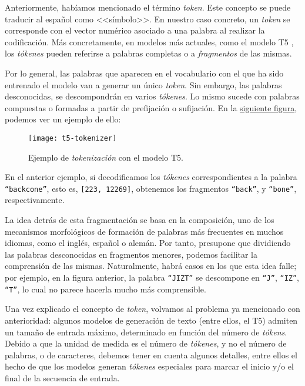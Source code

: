 Anteriormente, habíamos mencionado el término \emph{token}. Este concepto se puede traducir al español como <<símbolo>>. En nuestro caso concreto, un \emph{token} se corresponde con el vector numérico asociado a una palabra al realizar la codificación. Más concretamente, en modelos más actuales, como el modelo T5 \cite{raffel19}, los \emph{tókenes} pueden referirse a palabras completas o a \emph{fragmentos} de las mismas.

Por lo general, las palabras que aparecen en el vocabulario con el que ha sido entrenado el modelo van a generar un único \emph{token}. Sin embargo, las palabras desconocidas, se descompondrán en varios \emph{tókenes}. Lo mismo sucede con palabras compuestas o formadas a partir de prefijación o sufijación. En la \hyperref[fig:t5-tokenizer]{siguiente figura}, podemos ver un ejemplo de ello:

\begin{figure}[h]
	\centering
	\texttt{[image: t5-tokenizer]}
	\caption{Ejemplo de \emph{tokenización} con el modelo T5.}
	\label{fig:t5-tokenizer}
\end{figure}

En el anterior ejemplo, si decodificamos los \emph{tókenes} correspondientes a la palabra \texttt{``backcone''}, esto es, \texttt{[223, 12269]}, obtenemos los fragmentos \texttt{``back''}, y \texttt{``bone''}, respectivamente.

La idea detrás de esta fragmentación se basa en la composición, uno de los mecanismos morfológicos de formación de palabras más frecuentes \cite{cetnarowska05} en muchos idiomas, como el inglés, español o alemán. Por tanto, presupone que dividiendo las palabras desconocidas en fragmentos menores, podemos facilitar la comprensión de las mismas. Naturalmente, habrá casos en los que esta idea falle; por ejemplo, en la figura anterior, la palabra \texttt{``JIZT''} se descompone en \texttt{``J''}, \texttt{``IZ''}, \texttt{``T''}, lo cual no parece hacerla mucho más comprensible.

Una vez explicado el concepto de \emph{token}, volvamos al problema ya mencionado con anterioridad: algunos modelos de generación de texto (entre ellos, el T5) admiten un tamaño de entrada máximo, determinado en función del número de \emph{tókens}. Debido a que la unidad de medida es el número de \emph{tókenes}, y no el número de palabras, o de caracteres, debemos tener en cuenta algunos detalles, entre ellos el hecho de que los modelos generan \emph{tókenes} especiales para marcar el inicio y/o el final de la secuencia de entrada.


